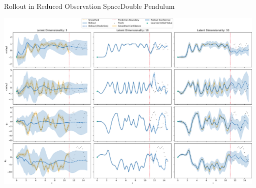 \documentclass[
	aspectratio=43,
	color={accentcolor=1c},
	logo=false,
	colorframetitle=true,
	handout
]{tudabeamer}
\begin{document}
			\begin{frame}{Rollout in Reduced Observation Space}{Double Pendulum}
				\begin{center}
					\includegraphics[width=0.8\linewidth]{figures/experiments/acrobot-gym/different-latent-dims-rollouts-reduced.pdf}
				\end{center}
			\end{frame}
\end{document}
